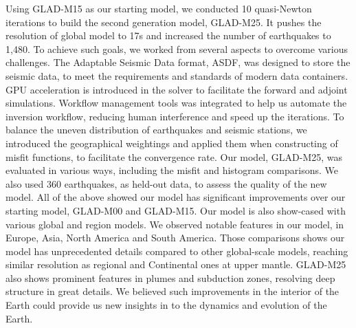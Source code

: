 Using GLAD-M15 as our starting model, we conducted 10 quasi-Newton iterations to build
the second generation model, GLAD-M25. It pushes the resolution of global model to 17s
and increased the number of earthquakes to 1,480.
To achieve such goals, we worked from several
aspects to overcome various challenges. The Adaptable Seismic Data format, ASDF,
was designed to store the seismic data, to meet the requirements and standards
of modern data containers. GPU acceleration is introduced in the solver to facilitate
the forward and adjoint simulations. Workflow management tools was integrated to help
us automate the inversion workflow, reducing human interference and speed up the
iterations. To balance the uneven distribution of earthquakes and seismic stations,
we introduced the geographical weightings and applied them when constructing of misfit
functions, to facilitate the convergence rate.
Our model, GLAD-M25, was evaluated in various
ways, including the misfit and histogram comparisons.
We also used 360 earthquakes, as held-out
data, to assess the quality of the new model. All of the above showed our model has
significant improvements over our starting model, GLAD-M00 and GLAD-M15.
Our model is also show-cased with various global and region models.
We observed notable features
in our model, in Europe, Asia, North America and South America. Those comparisons
shows our model has unprecedented details compared to other global-scale models, reaching similar resolution as regional and Continental ones at upper mantle.
GLAD-M25 also shows prominent features in plumes and subduction zones, resolving deep structure in great details.
We believed such improvements in the interior of the Earth could 
provide us new insights in to the dynamics and evolution of the Earth.


